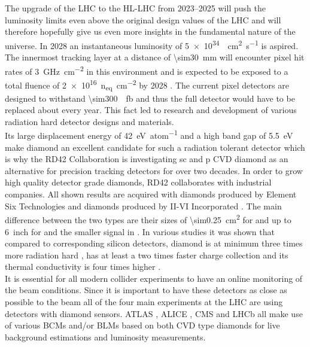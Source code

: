 The upgrade of the \ac{LHC} to the \ac{HL-LHC} from \SIrange{2023}{2025}{} \cite{hllhc} will push the luminosity limits even above the original design values of the \ac{LHC} and will therefore hopefully give us even more insights in the fundamental nature of the universe. In 2028 an instantaneous luminosity of \SI{5e34}{\per\centi\meter\squared\per\second} is aspired. The innermost tracking layer at a distance of \SI{\sim30}{\milli\meter} will encounter pixel hit rates of \SI{3}{\giga\hertz\per\centi\meter^2} in this environment and is expected to be exposed to a total fluence of \SI{2e16}{n_{eq}\per \centi\meter^2} by 2028 \cite{auzinger}. The current pixel detectors are designed to withstand \SI{\sim300}{\per\femto\barn} and thus the full detector would have to be replaced about every year. This fact led to research and development of various radiation hard detector designs and materials.\\
Its large displacement energy of \SI{42}{\electronvolt\per atom} and a high band gap of \SI{5.5}{\electronvolt} make diamond an excellent candidate for such a radiation tolerant detector which is why the RD42 Collaboration is investigating \ac{sc} and \ac{p} \ac{CVD} diamond as an alternative for precision tracking detectors for over two decades. In order to grow high quality detector grade diamonds, RD42 collaborates with industrial companies. All shown results are acquired with \sccvd diamonds produced by Element Six Technologies \cite{e6} and \pcvd diamonds produced by II-VI Incorporated \cite{II6}. The main difference between the two types are their sizes of \SI{\sim0.25}{\centi\meter\squared} for \sccvd and up to \SI{6}{inch} for \pcvd and the  smaller signal in \pcvd \cite{felix}.
In various studies it was shown that compared to corresponding silicon detectors, diamond is at minimum three times more radiation hard \cite{deboer}, has at least a two times faster charge collection \cite{pernegger} and its thermal conductivity is four times higher \cite{zhao}.\\
It is essential for all modern collider experiments to have an online monitoring of the beam conditions. Since it is important to have these detectors as close as possible to the beam all of the four main experiments at the \ac{LHC} are using detectors with diamond sensors. ATLAS \cite{gorisek}, ALICE \cite{hempel}, CMS \cite{bartz} and LHCb \cite{domke} all make use of various \acp{BCM} and/or \acp{BLM} based on both \ac{CVD} type diamonds for live background estimations and luminosity measurements.\\
